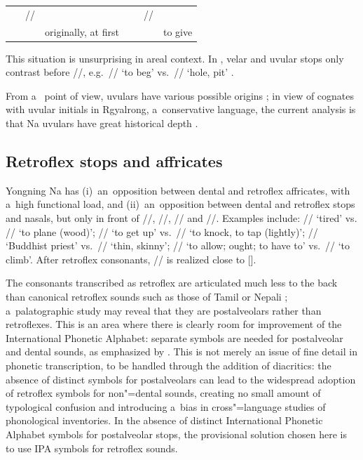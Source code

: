 \begin{exe}
\begin{xlist}
					\Hack{\vspace*{.5\baselineskip}}
					\extab
					\begin{tabularx}{112mm}{ P{14mm} P{27mm} P{15mm} Q }
						~~~// &  & ~~~// &\\
						 & originally, at first &  & to give\\
					\end{tabularx}
				\end{xlist}
			\end{exe}
			
			This situation is unsurprising in areal context. In , velar and uvular stops only contrast before
			//, e.g.~// ‘to beg’ vs.\ // ‘hole, pit’ \citep{chirkovaetal2012}. 
			
			From a~ point of view, uvulars have various possible origins \citep[782-783]{sun2003a}; in view of cognates with uvular initials in Rgyalrong, a~{conservative} language, the current analysis is that Na uvulars have great historical depth \citep[492]{jacquesetal2011}.
			
			
			\subsection{Retroflex stops and affricates}
			\label{sec:retroflexstopsandaffricates}
			
			Yongning Na has (i)~an~opposition between dental and retroflex affricates, with a~high functional
			load, and (ii)~an~opposition between dental and retroflex stops and nasals, but only in front of
			//, //, // and //. Examples include: // ‘tired’ vs.
			// ‘to plane (wood)’; // ‘to get up’ vs.\ // ‘to knock, to tap
			(lightly)’; // ‘Buddhist priest’ vs.\ // ‘thin, skinny’; // ‘to
			allow; ought; to have to’ vs.\ // ‘to climb’. After retroflex consonants, // is realized
			close to [].
			
			The consonants transcribed as retroflex are articulated much less to the back than canonical
			retroflex sounds such as those of Tamil or Nepali \citep{khatiwada2009}; a~palatographic study may reveal that they are
			postalveolars rather than retroflexes. This is an area where there is clearly room for improvement of the International Phonetic Alphabet: separate symbols are needed for postalveolar and dental sounds, as emphasized by \citet[21-30]{ladefogedetal1996}. This is not merely an issue of fine detail in phonetic transcription, to be handled through the addition of diacritics: the absence of distinct symbols for postalveolars can lead to the widespread adoption of retroflex symbols for non"=dental sounds, creating no small amount of typological confusion and introducing a~bias in cross"=language studies of phonological inventories. In the absence of distinct International Phonetic Alphabet
			symbols for postalveolar stops, the provisional solution chosen here is to use IPA symbols for retroflex sounds. 
			
